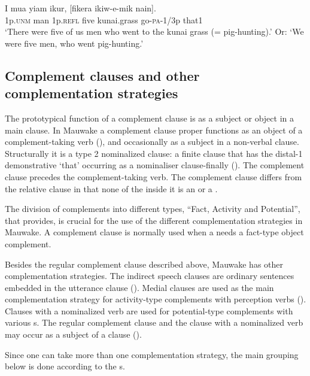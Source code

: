 \ea%
\label{ex:x1570}
\gll I  mua  yiam  ikur,  [fikera  ikiw-e-mik  nain]. \\
1p.\textsc{unm} man 1p.\textsc{refl} five kunai.grass go-\textsc{pa}-1/3p that1\\
\glt`There were five of us men who went to the kunai grass (= pig-hunting).' Or: `We were five men, who went pig-hunting.'
\z


\subsection{Complement clauses and other complementation strategies}

The prototypical function of a complement clause is as a subject or object in a main clause. In Mauwake a complement clause proper functions as an object of a complement-taking verb (), and occasionally as a subject in a non-verbal clause. Structurally it is a type 2 nominalized clause: a finite clause that has the distal-1 demonstrative  `that' occurring as a nominaliser clause-finally (). The complement clause precedes the complement-taking verb. The complement clause differs from the relative clause in that none of the  inside it is an  or a . 

The division of complements into different types, ``Fact, Activity and Potential'', that \citet[371]{Dixon2010b} provides, is crucial for the use of the different complementation strategies in Mauwake.  A complement clause is normally used when a  needs a fact-type object complement.

Besides the regular complement clause described above, Mauwake has other complementation strategies. The indirect speech clauses are ordinary sentences embedded in the utterance clause (). Medial clauses are used as the main complementation strategy for activity-type complements with perception verbs (). Clauses with a nominalized verb are used for potential-type complements with various s. The regular complement clause and the clause with a nominalized verb may occur as a subject of a clause (). 

Since one  can take more than one complementation strategy, the main grouping below is done according to the s.

